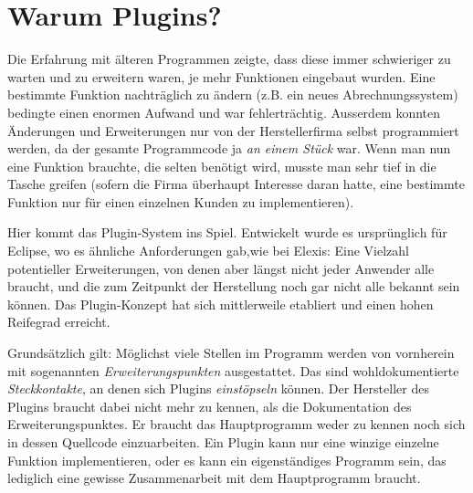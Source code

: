 
\section{Warum Plugins?}
\label{expl:plugins}
Die Erfahrung mit älteren Programmen zeigte, dass diese immer schwieriger zu warten und zu erweitern waren, je mehr Funktionen eingebaut wurden. Eine bestimmte Funktion nachträglich zu ändern (z.B. ein neues Abrechnungssystem) bedingte einen enormen Aufwand und war fehlerträchtig. Ausserdem konnten Änderungen und Erweiterungen nur von der Herstellerfirma selbst programmiert werden, da der gesamte Programmcode ja \textit{an einem Stück} war. Wenn man nun eine Funktion brauchte, die selten benötigt wird, musste man sehr tief in die Tasche greifen (sofern die Firma überhaupt Interesse daran hatte, eine bestimmte Funktion nur für einen einzelnen Kunden zu implementieren).

Hier kommt das Plugin-System ins Spiel. Entwickelt wurde es ursprünglich für Eclipse, wo es ähnliche Anforderungen gab,wie bei Elexis: Eine Vielzahl potentieller Erweiterungen, von denen aber längst nicht jeder Anwender alle braucht, und die zum Zeitpunkt der Herstellung noch gar nicht alle bekannt sein können. Das Plugin-Konzept hat sich mittlerweile etabliert und einen hohen Reifegrad erreicht.

Grundsätzlich gilt: Möglichst viele Stellen im Programm werden von vornherein mit sogenannten \textit{Erweiterungspunkten} ausgestattet. Das sind wohldokumentierte \textit{Steckkontakte}, an denen sich Plugins \textit{einstöpseln} können. Der Hersteller des Plugins braucht dabei nicht mehr zu kennen, als die Dokumentation des Erweiterungspunktes. Er braucht das Hauptprogramm weder zu kennen noch sich in dessen Quellcode einzuarbeiten. Ein Plugin kann nur eine winzige einzelne Funktion implementieren, oder es kann ein eigenständiges Programm sein, das lediglich eine gewisse Zusammenarbeit mit dem Hauptprogramm braucht.

